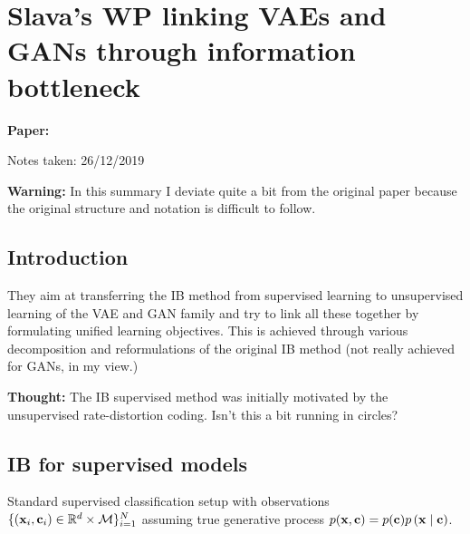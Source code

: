 \providecommand{\qfz}{}
\renewcommand{\qfz}{q_\phi( \bz \mid \bx)}
\providecommand{\ptc}{}
\renewcommand{\ptc}{p_\theta( \bc \mid \bz)}
\providecommand{\ptx}{}
\renewcommand{\ptx}{p_\theta( \bx \mid \bz)}
\providecommand{\pxz}{}
\renewcommand{\pxz}{p_\xi(\bz)}

\clearpage

\section{Slava's WP linking VAEs and GANs through information bottleneck}\label{sec:ibvariational}


\begin{notebox}
\textbf{Paper: } 

\hfill Notes taken: 26/12/2019 
\end{notebox}

\begin{notebox}
\textbf{Warning:} In this summary I deviate quite a bit from the original paper because the original structure and notation is difficult to follow.
\end{notebox}

\subsection{Introduction}

They aim at transferring the IB method from supervised learning to unsupervised learning of the VAE and GAN family and try to link all these together by formulating unified learning objectives.
This is achieved through various decomposition and reformulations of the original IB method (not really achieved for GANs, in my view.)

\begin{notebox}
\textbf{Thought:} The IB supervised method was initially motivated by the unsupervised rate-distortion coding. Isn't this a bit running in circles?
\end{notebox}

\subsection{IB for supervised models}

Standard supervised classification setup with observations $\{(\mathbf{x}_i, \mathbf{c}_i) \in \mathbb{R}^d \times \mathcal{M}\}_{i=1}^N$ assuming true generative process $p(\mathbf{x}, \mathbf{c}) = p(\mathbf{c})p \left( \mathbf{x} \mid \mathbf{c} \right)$.

